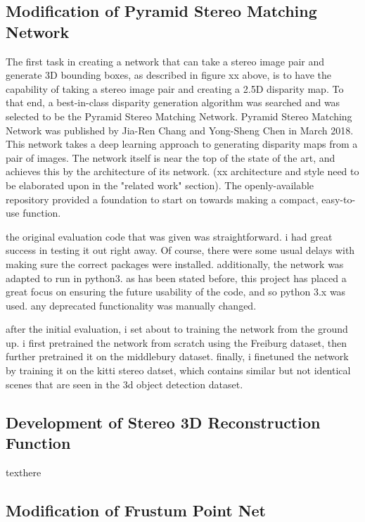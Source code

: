 \subsection{Modification of Pyramid Stereo Matching Network}
The first task in creating a network that can take a stereo image pair and generate 3D bounding boxes, as described in figure xx above, is to have the capability of taking a stereo image pair and creating a 2.5D disparity map. To that end, a best-in-class disparity generation algorithm was searched and was selected to be the Pyramid Stereo Matching Network. Pyramid Stereo Matching Network was published by Jia-Ren Chang and Yong-Sheng Chen in March 2018. This network takes a deep learning approach to generating disparity maps from a pair of images. The network itself is near the top of the state of the art, and achieves this by the architecture of its network. (xx architecture and style need to be elaborated upon in the "related work" section). The openly-available repository provided a foundation to start on towards making a compact, easy-to-use function. 

the original evaluation code that was given was straightforward. i had great success in testing it out right away. Of course, there were some usual delays with making sure the correct packages were installed. additionally, the network was adapted to run in python3. as has been stated before, this project has placed a great focus on ensuring the future usability of the code, and so python 3.x was used. any deprecated functionality was manually changed. 

after the initial evaluation, i set about to training the network from the ground up. i first pretrained the network from scratch using the Freiburg dataset, then further pretrained it on the middlebury dataset. finally, i finetuned the network by training it on the kitti stereo datset, which contains similar but not identical scenes that are seen in the 3d object detection dataset. 



\subsection{Development of Stereo 3D Reconstruction Function}
texthere

\subsection{Modification of Frustum Point Net}


